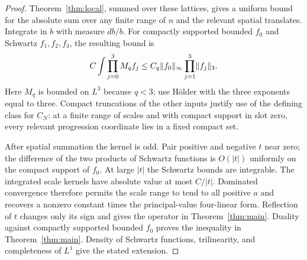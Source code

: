\begin{proof}
Theorem~\ref{thm:local}, summed over these lattices, gives a uniform
bound for the absolute sum over any finite range of $n$ and the relevant
spatial translates.  Integrate in $b$ with measure $db/b$.  For compactly
supported bounded $f_0$ and Schwartz $f_1,f_2,f_3$, the resulting bound is
\[
 C\int\prod_{j=0}^3M_qf_j
 \le C_q\lVert f_0\rVert_\infty\prod_{j=1}^3\lVert f_j\rVert_3.
\]
Here $M_q$ is bounded on $L^3$ because $q<3$; use H\"older with the
three exponents equal to three.  Compact truncations of the other
inputs justify use of the defining class for $C_N$: at a finite range
of scales and with compact support in slot zero, every relevant
progression coordinate lies in a fixed compact set.

After spatial summation the kernel is odd.  Pair positive and negative
$t$ near zero; the difference of the two products of Schwartz functions
is $O(|t|)$ uniformly on the compact support of $f_0$.  At large $|t|$
the Schwartz bounds are integrable.  The integrated scale kernels have
absolute value at most $C/|t|$.  Dominated convergence therefore permits
the scale range to tend to all positive $a$ and recovers a nonzero
constant times the principal-value four-linear form.  Reflection of
$t$ changes only its sign and gives the operator in
Theorem~\ref{thm:main}.  Duality against compactly supported bounded
$f_0$ proves the inequality in Theorem~\ref{thm:main}.  Density of Schwartz functions,
trilinearity, and completeness of $L^1$ give the stated extension.
\end{proof}
